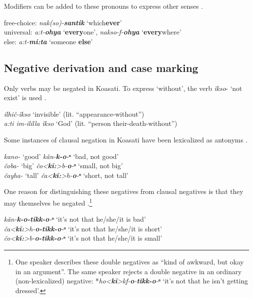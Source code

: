 \documentclass[output=paper,colorlinks,citecolor=brown]{langscibook}
\begin{document}
Modifiers can be added to these pronouns to express other senses .

\ea\label{ex:koa:42}
free-choice: \tab \textit{nak(so)-}\textbf{\textit{santik}} ‘which\textbf{ever}’ \\
universal: \tab  \textit{a:t-}\textbf{\textit{ohya}} ‘\textbf{every}one’, \textit{nakso-f-}\textbf{\textit{ohya}} ‘\textbf{every}where’ \\
else: \tab  \textit{a:t-}\textbf{\textit{mi:ta}} ‘someone \textbf{else}’ \\
\z 
{}

\subsection{Negative derivation and case marking}\label{sec:koa:3.3} 
Only verbs may be negated in Koasati. To express ‘without’, the verb \textit{ǐkso}- ‘not exist’ is used .

\ea\label{ex:koa:43}
\textit{ilhič-ǐkso} \tab ‘invisible’ (lit. “appearance-without”) \\ 
\textit{a:ti im-ililla ǐkso} \tab ‘God’ (lit. “person their-death-without”) \\
\z 

Some instances of clausal negation in Koasati have been lexicalized as antonyms .

\ea\label{ex:koa:44}
\textit{kano-} ‘good’ \tab \textit{kǎn-\textbf{k-o}-ⁿ} ‘bad, not good’ \\
\textit{čoba-} ‘big’ \tab \textit{čo<\textbf{kǐ:}>b-\textbf{o}-ⁿ} ‘small, not big’ \\
\textit{čayha-} ‘tall’ \tab \textit{ča<\textbf{kǐ:}>h-\textbf{o}-ⁿ} ‘short, not tall’ \\
\z 

One reason for distinguishing these negatives from clausal negatives is that they may themselves be negated .\footnote{One speaker describes these double negatives as “kind of awkward, but okay in an argument”. The same speaker rejects a double negative in an ordinary (non-lexicalized) negative: *\textit{ho<}\textbf{\textit{kǐ}}\textit{>kf-}\textbf{\textit{o}}\textit{{}-}\textbf{\textit{tǐkk-o}}\textit{{}-ⁿ} ‘it’s not that he isn’t getting dressed’.}

\ea\label{ex:koa:45}
\textit{kǎn-\textbf{k-o-t\v{i}kk-o}-ⁿ} \tab ‘it’s not that he/she/it is bad’ \\
\textit{ča<\textbf{kǐ:}>h-\textbf{o-tǐkk-o}-ⁿ} \tab ‘it’s not that he/she/it is short’ \\
\textit{čo<\textbf{kǐ:}>b-\textbf{o-tǐkk-o}-ⁿ} \tab ‘it’s not that he/she/it is small’ \\
\z 
\end{document}
